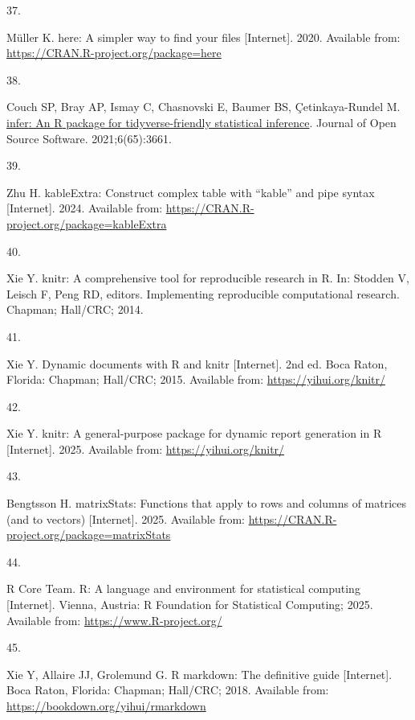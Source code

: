 \documentclass[
]{article}
\newlength{\cslhangindent}
\newlength{\csllabelwidth}
\newenvironment{CSLReferences}[2] %
 {\begin{list}{}{%
  \setlength{\itemindent}{0pt}
  \setlength{\leftmargin}{0pt}
  \setlength{\parsep}{0pt}
  \ifodd #1
   \setlength{\leftmargin}{\cslhangindent}
   \setlength{\itemindent}{-1\cslhangindent}
  \fi
  \setlength{\itemsep}{#2\baselineskip}}}
 {\end{list}}
\newcommand{\CSLLeftMargin}[1]{\parbox[t]{\csllabelwidth}{\strut#1\strut}}
\newcommand{\CSLRightInline}[1]{\parbox[t]{\linewidth - \csllabelwidth}{\strut#1\strut}}
\begin{document}
\begin{CSLReferences}{0}{1}
\CSLLeftMargin{37. }%
\CSLRightInline{Müller K. {here}: A simpler way to find your files {[}Internet{]}. 2020. Available from: \url{https://CRAN.R-project.org/package=here}}

\CSLLeftMargin{38. }%
\CSLRightInline{Couch SP, Bray AP, Ismay C, Chasnovski E, Baumer BS, Çetinkaya-Rundel M. \href{https://doi.org/10.21105/joss.03661}{{infer}: An {R} package for tidyverse-friendly statistical inference}. Journal of Open Source Software. 2021;6(65):3661. }

\CSLLeftMargin{39. }%
\CSLRightInline{Zhu H. {kableExtra}: Construct complex table with {``{kable}''} and pipe syntax {[}Internet{]}. 2024. Available from: \url{https://CRAN.R-project.org/package=kableExtra}}

\CSLLeftMargin{40. }%
\CSLRightInline{Xie Y. {knitr}: A comprehensive tool for reproducible research in {R}. In: Stodden V, Leisch F, Peng RD, editors. Implementing reproducible computational research. Chapman; Hall/CRC; 2014. }

\CSLLeftMargin{41. }%
\CSLRightInline{Xie Y. Dynamic documents with {R} and knitr {[}Internet{]}. 2nd ed. Boca Raton, Florida: Chapman; Hall/CRC; 2015. Available from: \url{https://yihui.org/knitr/}}

\CSLLeftMargin{42. }%
\CSLRightInline{Xie Y. {knitr}: A general-purpose package for dynamic report generation in {R} {[}Internet{]}. 2025. Available from: \url{https://yihui.org/knitr/}}

\CSLLeftMargin{43. }%
\CSLRightInline{Bengtsson H. {matrixStats}: Functions that apply to rows and columns of matrices (and to vectors) {[}Internet{]}. 2025. Available from: \url{https://CRAN.R-project.org/package=matrixStats}}

\CSLLeftMargin{44. }%
\CSLRightInline{R Core Team. {R}: A language and environment for statistical computing {[}Internet{]}. Vienna, Austria: R Foundation for Statistical Computing; 2025. Available from: \url{https://www.R-project.org/}}

\CSLLeftMargin{45. }%
\CSLRightInline{Xie Y, Allaire JJ, Grolemund G. R markdown: The definitive guide {[}Internet{]}. Boca Raton, Florida: Chapman; Hall/CRC; 2018. Available from: \url{https://bookdown.org/yihui/rmarkdown}}


\end{CSLReferences}
\end{document}
